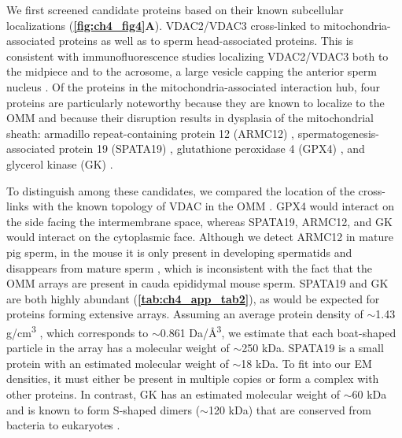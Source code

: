 We first screened candidate proteins based on their known subcellular localizations (\textbf{\autoref{fig:ch4_fig4}A}). VDAC2/\linebreak VDAC3 cross-linked to mitochondria-associated proteins as well as to sperm head-associated proteins. This is consistent with immunofluorescence studies localizing VDAC2/VDAC3 both to the midpiece and to the acrosome, a large vesicle capping the anterior sperm nucleus \cite{Kwon2013, Hinsch2004, Arcelay2008}. Of the proteins in the mitochondria-associated interaction hub, four proteins are particularly noteworthy because they are known to localize to the OMM and because their disruption results in dysplasia of the mitochondrial sheath: armadillo repeat-containing protein 12 (ARMC12) \cite{Shimada2021}, spermatogenesis-associated protein 19 (SPATA19) \cite{Mi2015}, glutathione peroxidase 4 (GPX4) \cite{Schneider2009, Imai2009}, and glycerol kinase (GK) \cite{Chen2017a, Shimada2019}.

To distinguish among these candidates, we compared the location of the cross-links with the known topology of VDAC in the OMM \cite{Tomasello2013, Bayrhuber2008}. GPX4 would interact on the side facing the intermembrane space, whereas SPATA19, ARMC12, and GK would interact on the cytoplasmic face. Although we detect ARMC12 in mature pig sperm, in the mouse it is only present in developing spermatids and disappears from mature sperm \cite{Shimada2021}, which is inconsistent with the fact that the OMM arrays are present in cauda epididymal mouse sperm. SPATA19 and GK are both highly abundant (\textbf{\autoref{tab:ch4_app_tab2}}), as would be expected for proteins forming extensive arrays. Assuming an average protein density of $\sim$1.43 g/cm\textsuperscript{3} \cite{Quillin2000}, which corresponds to $\sim$0.861 Da/Å\textsuperscript{3}, we estimate that each boat-shaped particle in the array has a molecular weight of $\sim$250 kDa. SPATA19 is a small protein with an estimated molecular weight of $\sim$18 kDa. To fit into our EM densities, it must either be present in multiple copies or form a complex with other proteins. In contrast, GK has an estimated molecular weight of $\sim$60 kDa and is known to form S-shaped dimers ($\sim$120 kDa) that are conserved from bacteria \cite{Fukuda2016, Bystrom1999} to eukaryotes \cite{Balogun2019, Schnick2009}.

